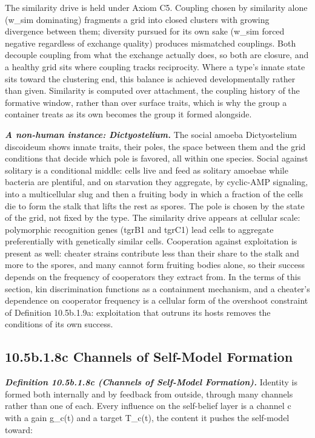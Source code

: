 \documentclass[
]{article}
\begin{document}
The similarity drive is held under Axiom C5. Coupling chosen by
similarity alone (w\_sim dominating) fragments a grid into closed
clusters with growing divergence between them; diversity pursued for its
own sake (w\_sim forced negative regardless of exchange quality)
produces mismatched couplings. Both decouple coupling from what the
exchange actually does, so both are closure, and a healthy grid sits
where coupling tracks reciprocity. Where a type's innate state sits
toward the clustering end, this balance is achieved developmentally
rather than given. Similarity is computed over attachment, the coupling
history of the formative window, rather than over surface traits, which
is why the group a container treats as its own becomes the group it
formed alongside.

\emph{\textbf{A non-human instance: Dictyostelium.}} The social amoeba
Dictyostelium discoideum shows innate traits, their poles, the space
between them and the grid conditions that decide which pole is favored,
all within one species. Social against solitary is a conditional middle:
cells live and feed as solitary amoebae while bacteria are plentiful,
and on starvation they aggregate, by cyclic-AMP signaling, into a
multicellular slug and then a fruiting body in which a fraction of the
cells die to form the stalk that lifts the rest as spores. The pole is
chosen by the state of the grid, not fixed by the type. The similarity
drive appears at cellular scale: polymorphic recognition genes (tgrB1
and tgrC1) lead cells to aggregate preferentially with genetically
similar cells. Cooperation against exploitation is present as well:
cheater strains contribute less than their share to the stalk and more
to the spores, and many cannot form fruiting bodies alone, so their
success depends on the frequency of cooperators they extract from. In
the terms of this section, kin discrimination functions as a containment
mechanism, and a cheater's dependence on cooperator frequency is a
cellular form of the overshoot constraint of Definition 10.5b.1.9a:
exploitation that outruns its hosts removes the conditions of its own
success.

\hypertarget{b.1.8c-channels-of-self-model-formation}{%
\subsection{10.5b.1.8c Channels of Self-Model
Formation}\label{b.1.8c-channels-of-self-model-formation}}

\emph{\textbf{Definition 10.5b.1.8c (Channels of Self-Model
Formation).}} Identity is formed both internally and by feedback from
outside, through many channels rather than one of each. Every influence
on the self-belief layer is a channel c with a gain g\_c(t) and a target
T\_c(t), the content it pushes the self-model toward:
\end{document}
